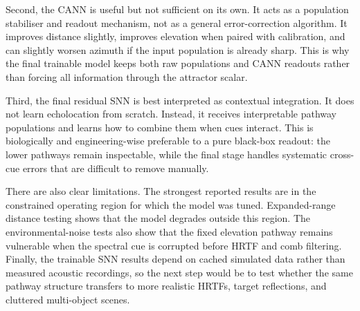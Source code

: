 Second, the CANN is useful but not sufficient on its own. It acts as a population stabiliser and readout mechanism, not as a general error-correction algorithm. It improves distance slightly, improves elevation when paired with calibration, and can slightly worsen azimuth if the input population is already sharp. This is why the final trainable model keeps both raw populations and CANN readouts rather than forcing all information through the attractor scalar.

Third, the final residual SNN is best interpreted as contextual integration. It does not learn echolocation from scratch. Instead, it receives interpretable pathway populations and learns how to combine them when cues interact. This is biologically and engineering-wise preferable to a pure black-box readout: the lower pathways remain inspectable, while the final stage handles systematic cross-cue errors that are difficult to remove manually.

There are also clear limitations. The strongest reported results are in the constrained operating region for which the model was tuned. Expanded-range distance testing shows that the model degrades outside this region. The environmental-noise tests also show that the fixed elevation pathway remains vulnerable when the spectral cue is corrupted before HRTF and comb filtering. Finally, the trainable SNN results depend on cached simulated data rather than measured acoustic recordings, so the next step would be to test whether the same pathway structure transfers to more realistic HRTFs, target reflections, and cluttered multi-object scenes.
